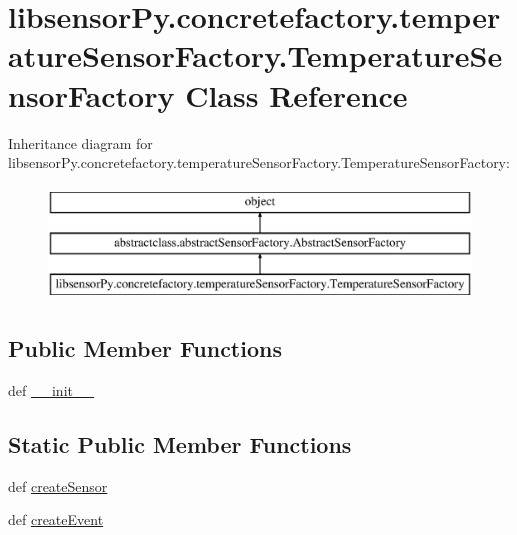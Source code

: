 \hypertarget{classlibsensorPy_1_1concretefactory_1_1temperatureSensorFactory_1_1TemperatureSensorFactory}{}\section{libsensor\+Py.\+concretefactory.\+temperature\+Sensor\+Factory.\+Temperature\+Sensor\+Factory Class Reference}
\label{classlibsensorPy_1_1concretefactory_1_1temperatureSensorFactory_1_1TemperatureSensorFactory}
Inheritance diagram for libsensor\+Py.\+concretefactory.\+temperature\+Sensor\+Factory.\+Temperature\+Sensor\+Factory\+:\begin{figure}[H]
\begin{center}
\leavevmode
\includegraphics[height=3.000000cm]{classlibsensorPy_1_1concretefactory_1_1temperatureSensorFactory_1_1TemperatureSensorFactory}
\end{center}
\end{figure}
\subsection*{Public Member Functions}
\begin{DoxyCompactItemize}
\item 
def \hyperlink{classlibsensorPy_1_1concretefactory_1_1temperatureSensorFactory_1_1TemperatureSensorFactory_ac2e820798ff2e68d36a059f699458ecb}{\+\_\+\+\_\+init\+\_\+\+\_\+}
\end{DoxyCompactItemize}
\subsection*{Static Public Member Functions}
\begin{DoxyCompactItemize}
\item 
def \hyperlink{classlibsensorPy_1_1concretefactory_1_1temperatureSensorFactory_1_1TemperatureSensorFactory_a87cacd17a2dffcd11c37bca27daefaea}{create\+Sensor}
\item 
def \hyperlink{classlibsensorPy_1_1concretefactory_1_1temperatureSensorFactory_1_1TemperatureSensorFactory_a4b46b064d2ef6ee5138e6e8fb494b8ba}{create\+Event}
\end{DoxyCompactItemize}


